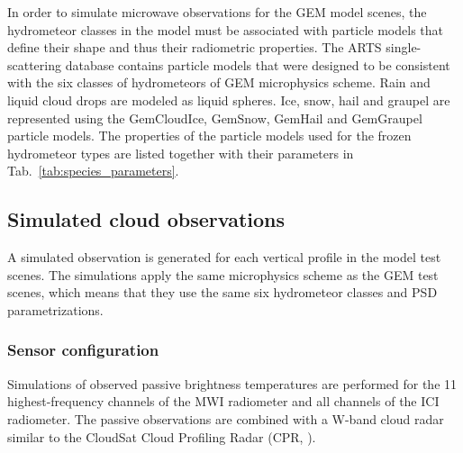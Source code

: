 \documentclass[journal abbreviation, manuscript]{copernicus}
\begin{document}
In order to simulate microwave observations for the GEM model scenes, the
hydrometeor classes in the model must be associated with particle models that
define their shape and thus their radiometric properties. The ARTS
single-scattering database contains particle models that were designed to be
consistent with the six classes of hydrometeors of GEM microphysics scheme. Rain
and liquid cloud drops are modeled as liquid spheres. Ice, snow, hail and
graupel are represented using the GemCloudIce, GemSnow, GemHail and GemGraupel
particle models. The properties of the particle models used for the frozen
hydrometeor types are listed together with their parameters in
Tab.~\ref{tab:species_parameters}.

\subsection{Simulated cloud observations}

A simulated observation is generated for each vertical profile in the
model test scenes. The simulations apply the same microphysics scheme
as the GEM test scenes, which means that they use the same six hydrometeor classes
and PSD parametrizations.

\subsubsection{Sensor configuration}
\label{sec:sensors}

Simulations of observed passive brightness temperatures are performed for the 11
highest-frequency channels of the MWI radiometer and all channels of the ICI
radiometer. The passive observations are combined with a W-band cloud radar
similar to the CloudSat Cloud Profiling Radar (CPR, \citet{stephens02,tanelli08}).
\end{document}
